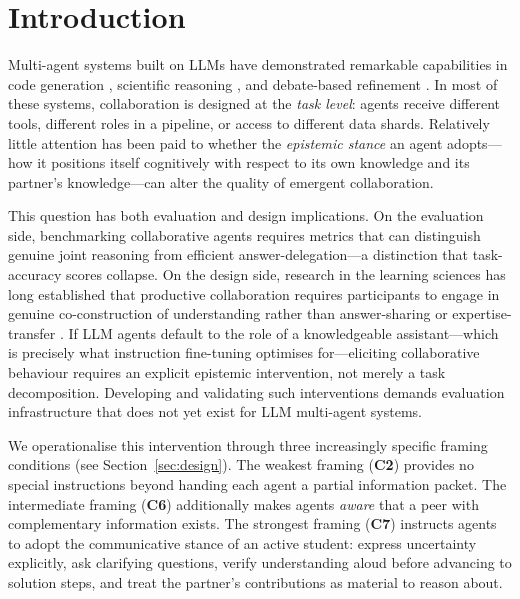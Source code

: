 \documentclass{article}
\begin{document}
\section{Introduction}
\label{sec:intro}

Multi-agent systems built on LLMs have demonstrated remarkable
capabilities in code generation \citep{hong2023metagpt}, scientific
reasoning \citep{lu2023mathvista}, and debate-based
refinement \citep{liang2023encouraging}. In most of these systems,
collaboration is designed at the \emph{task level}: agents receive
different tools, different roles in a pipeline, or access to different
data shards. Relatively little attention has been paid to whether the
\emph{epistemic stance} an agent adopts---how it positions itself
cognitively with respect to its own knowledge and its partner's
knowledge---can alter the quality of emergent collaboration.

This question has both evaluation and design implications. On the
evaluation side, benchmarking collaborative agents requires metrics
that can distinguish genuine joint reasoning from efficient
answer-delegation---a distinction that task-accuracy scores collapse.
On the design side, research in the learning sciences has long
established that productive collaboration requires participants to
engage in genuine co-construction of understanding rather than
answer-sharing or expertise-transfer
\citep{roschelle1995construction, dillenbourg1999collaborative}.
If LLM agents default to the role of a knowledgeable assistant---which
is precisely what instruction fine-tuning optimises for---eliciting
collaborative behaviour requires an explicit epistemic intervention,
not merely a task decomposition. Developing and validating such
interventions demands evaluation infrastructure that does not yet
exist for LLM multi-agent systems.

We operationalise this intervention through three increasingly
specific framing conditions (see Section~\ref{sec:design}). The
weakest framing (\textbf{C2}) provides no special instructions beyond
handing each agent a partial information packet. The intermediate
framing (\textbf{C6}) additionally makes agents \emph{aware} that a
peer with complementary information exists. The strongest framing (\textbf{C7}) instructs agents to adopt the
communicative stance of an active student: express uncertainty
explicitly, ask clarifying questions, verify understanding aloud before
advancing to solution steps, and treat the partner's contributions as
material to reason about.
\end{document}
